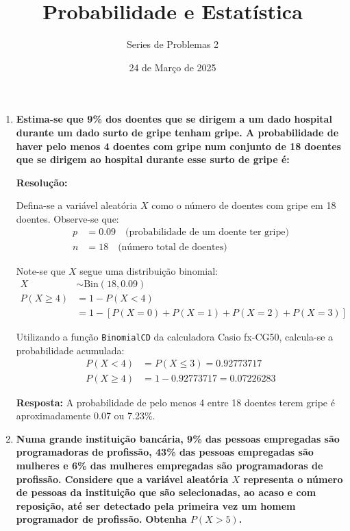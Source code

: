 \documentclass[a4paper,12pt]{article}
\author{Series de Problemas 2}
\begin{document}
\title{Probabilidade e Estatística}
\date{24 de Março de 2025}
\maketitle

\begin{enumerate}
  \item \textbf{Estima-se que 9\% dos doentes que se dirigem a um dado hospital durante um dado surto de gripe tenham gripe. A probabilidade de haver pelo menos 4 doentes com gripe num conjunto de 18 doentes que se dirigem ao hospital durante esse surto de gripe é:}
    
  \vspace{0.3cm}
  
  \begin{mdframed}[backgroundcolor=gray!10, linewidth=0pt, innertopmargin=10pt, innerbottommargin=10pt]
  \textbf{Resolução:}
  
  Defina-se a variável aleatória $X$ como o número de doentes com gripe em 18 doentes. Observe-se que:
  \begin{align*}
      p &= 0.09 \quad \text{(probabilidade de um doente ter gripe)} \\
      n &= 18 \quad \text{(número total de doentes)}
  \end{align*}

  Note-se que $X$ segue uma distribuição binomial:
  \begin{align*}
      X &\sim \text{Bin}(18, 0.09) \\
      P(X \geq 4) &= 1 - P(X < 4) \\
      &= 1 - [P(X=0) + P(X=1) + P(X=2) + P(X=3)]
  \end{align*}
  
  Utilizando a função \texttt{BinomialCD} da calculadora Casio fx-CG50, calcula-se a probabilidade acumulada:
  \begin{align*}
      P(X < 4) &= P(X \leq 3) = 0.92773717 \\
      P(X \geq 4) &= 1 - 0.92773717 = 0.07226283
  \end{align*}

  \textbf{Resposta:} A probabilidade de pelo menos 4 entre 18 doentes terem gripe é aproximadamente 0.07 ou 7.23\%.
  \end{mdframed}

  \vspace{0.5cm}

  \item \textbf{Numa grande instituição bancária, 9\% das pessoas empregadas são programadoras de profissão, 43\% das pessoas empregadas são mulheres e 6\% das mulheres empregadas são programadoras de profissão. Considere que a variável aleatória $ X $ representa o número de pessoas da instituição que são selecionadas, ao acaso e com reposição, até ser detectado pela primeira vez um homem programador de profissão.} 
  \textbf{Obtenha $ P(X > 5) $.}


\end{enumerate}
\end{document}

